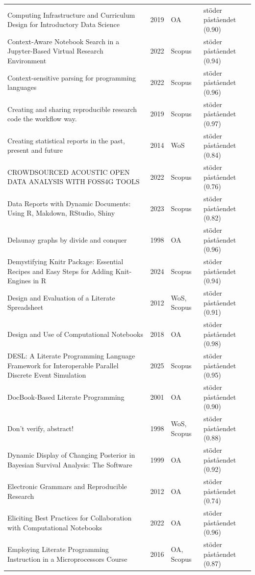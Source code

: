 \begin{longtable}{@{}%
  >{\raggedright\arraybackslash}p{}c%
  >{\raggedright\arraybackslash}p{}%
  >{\raggedright\arraybackslash}p{}@{}}
Computing Infrastructure and Curriculum Design for Introductory Data Science & 2019 & OA & stöder påståendet (0.90) \\
Context-Aware Notebook Search in a Jupyter-Based Virtual Research Environment & 2022 & Scopus & stöder påståendet (0.94) \\
Context-sensitive parsing for programming languages & 2022 & Scopus & stöder påståendet (0.96) \\
Creating and sharing reproducible research code the workflow way. & 2019 & Scopus & stöder påståendet (0.97) \\
Creating statistical reports in the past, present and future & 2014 & WoS & stöder påståendet (0.84) \\
CROWDSOURCED ACOUSTIC OPEN DATA ANALYSIS WITH FOSS4G TOOLS & 2022 & Scopus & stöder påståendet (0.76) \\
Data Reports with Dynamic Documents: Using R, Makdown, RStudio, Shiny & 2023 & Scopus & stöder påståendet (0.82) \\
Delaunay graphs by divide and conquer & 1998 & OA & stöder påståendet (0.96) \\
Demystifying Knitr Package: Essential Recipes and Easy Steps for Adding Knit-Engines in R & 2024 & Scopus & stöder påståendet (0.94) \\
Design and Evaluation of a Literate Spreadsheet & 2012 & WoS, Scopus & stöder påståendet (0.91) \\
Design and Use of Computational Notebooks & 2018 & OA & stöder påståendet (0.98) \\
DESL: A Literate Programming Language Framework for Interoperable Parallel Discrete Event Simulation & 2025 & Scopus & stöder påståendet (0.95) \\
DocBook-Based Literate Programming & 2001 & OA & stöder påståendet (0.90) \\
Don't verify, abstract! & 1998 & WoS, Scopus & stöder påståendet (0.88) \\
Dynamic Display of Changing Posterior in Bayesian Survival Analysis: The Software & 1999 & OA & stöder påståendet (0.92) \\
Electronic Grammars and Reproducible Research & 2012 & OA & stöder påståendet (0.74) \\
Eliciting Best Practices for Collaboration with Computational Notebooks & 2022 & OA & stöder påståendet (0.96) \\
Employing Literate Programming Instruction in a Microprocessors Course & 2016 & OA, Scopus & stöder påståendet (0.87) \\

\end{longtable}
